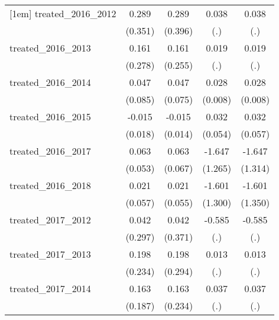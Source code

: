 {\begin{tabular}{l*{4}{c}}
[1em]
treated\_2016\_2012&       0.289         &       0.289         &       0.038         &       0.038         \\
            &     (0.351)         &     (0.396)         &         (.)         &         (.)         \\
[1em]
treated\_2016\_2013&       0.161         &       0.161         &       0.019         &       0.019         \\
            &     (0.278)         &     (0.255)         &         (.)         &         (.)         \\
[1em]
treated\_2016\_2014&       0.047         &       0.047         &       0.028\sym{***}&       0.028\sym{***}\\
            &     (0.085)         &     (0.075)         &     (0.008)         &     (0.008)         \\
[1em]
treated\_2016\_2015&      -0.015         &      -0.015         &       0.032         &       0.032         \\
            &     (0.018)         &     (0.014)         &     (0.054)         &     (0.057)         \\
[1em]
treated\_2016\_2017&       0.063         &       0.063         &      -1.647         &      -1.647         \\
            &     (0.053)         &     (0.067)         &     (1.265)         &     (1.314)         \\
[1em]
treated\_2016\_2018&       0.021         &       0.021         &      -1.601         &      -1.601         \\
            &     (0.057)         &     (0.055)         &     (1.300)         &     (1.350)         \\
[1em]
treated\_2017\_2012&       0.042         &       0.042         &      -0.585         &      -0.585         \\
            &     (0.297)         &     (0.371)         &         (.)         &         (.)         \\
[1em]
treated\_2017\_2013&       0.198         &       0.198         &       0.013         &       0.013         \\
            &     (0.234)         &     (0.294)         &         (.)         &         (.)         \\
[1em]
treated\_2017\_2014&       0.163         &       0.163         &       0.037         &       0.037         \\
            &     (0.187)         &     (0.234)         &         (.)         &         (.)         \\

\end{tabular}}
